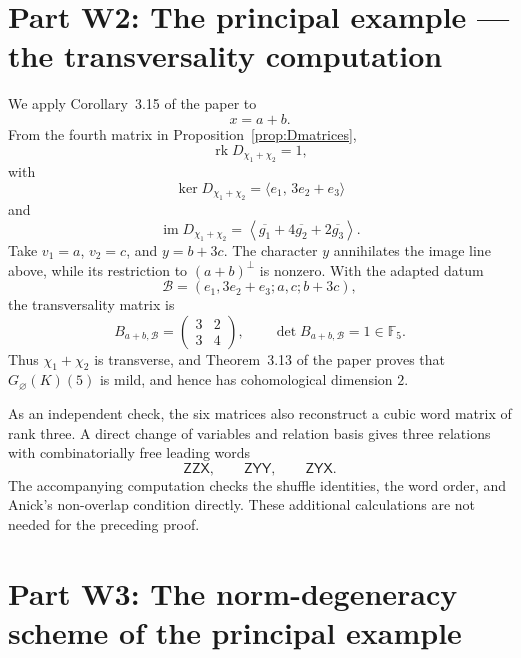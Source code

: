 \documentclass[11pt]{article}
\newcommand{\Ffive}{\mathbb F_5}
\newcommand{\mx}{\mathsf{X}}
\newcommand{\my}{\mathsf{Y}}
\newcommand{\mz}{\mathsf{Z}}
\newcommand{\rk}{\operatorname{rk}}
\begin{document}
\section*{Part W2: The principal example --- the transversality computation}

We apply Corollary~3.15 of the paper to
\[
  x=a+b.
\]
From the fourth matrix in Proposition~\ref{prop:Dmatrices},
\[
  \rk D_{\chi_1+\chi_2}=1,
\]
with
\[
  \ker D_{\chi_1+\chi_2}
  =\langle e_1,\,3e_2+e_3\rangle
\]
and
\[
  \operatorname{im}D_{\chi_1+\chi_2}
  =\left\langle
    \overline{g_1}+4\overline{g_2}+2\overline{g_3}
  \right\rangle.
\]
Take $v_1=a$, $v_2=c$, and $y=b+3c$.  The character $y$ annihilates the
image line above, while its restriction to $(a+b)^\perp$ is nonzero.  With
the adapted datum
\[
  \mathcal B=(e_1,3e_2+e_3;a,c;b+3c),
\]
the transversality matrix is
\[
  B_{a+b,\mathcal B}=
  \begin{pmatrix}
    3&2\\
    3&4
  \end{pmatrix},
  \qquad
  \det B_{a+b,\mathcal B}=1\in\Ffive.
\]
Thus $\chi_1{+}\chi_2$ is transverse, and Theorem~3.13 of the paper proves that
$G_{\varnothing}(K)(5)$ is mild, and hence has cohomological dimension $2$.

As an independent check, the six matrices also reconstruct a cubic word
matrix of rank three.  A direct change of variables and relation basis gives
three relations with combinatorially free leading words
\[
  \mz\mz\mx,\qquad \mz\my\my,\qquad \mz\my\mx.
\]
The accompanying computation checks the shuffle identities, the word order,
and Anick's non-overlap condition directly.  These additional calculations
are not needed for the preceding proof.

\section*{Part W3: The norm-degeneracy scheme of the principal example}
\end{document}
